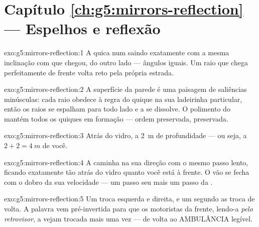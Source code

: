 \section*{Capítulo \ref{ch:g5:mirrors-reflection} --- Espelhos e reflexão}

\begin{solution}{exo:g5:mirrors-reflection:1}
A  quica num  saindo exatamente com a mesma inclinação com
que chegou, do outro lado --- ângulos iguais. Um raio que chega
perfeitamente de frente volta reto pela própria estrada.
\end{solution}

\begin{solution}{exo:g5:mirrors-reflection:2}
A superfície da parede é uma paisagem de saliências minúsculas: cada
raio obedece à regra do quique na sua ladeirinha particular, então os
raios se espalham para todo lado e a  se dissolve. O polimento
do  mantém todos os quiques em formação --- ordem preservada,
 preservada.
\end{solution}

\begin{solution}{exo:g5:mirrors-reflection:3}
Atrás do vidro, a \qty{2}{m} de profundidade --- ou seja, a
$2 + 2 = \qty{4}{m}$ de você.
\end{solution}

\begin{solution}{exo:g5:mirrors-reflection:4}
A  caminha na sua direção com o mesmo passo lento, ficando
exatamente tão atrás do vidro quanto você está à frente. O vão se
fecha com o dobro da sua velocidade --- um passo seu mais um passo da
.
\end{solution}

\begin{solution}{exo:g5:mirrors-reflection:5}
Um  troca esquerda e direita, e um segundo  as troca de
volta. A palavra vem pré-invertida para que os motoristas da frente,
lendo-a \emph{pelo retrovisor}, a vejam trocada mais uma vez --- de
volta ao AMBULÂNCIA legível.
\end{solution}

